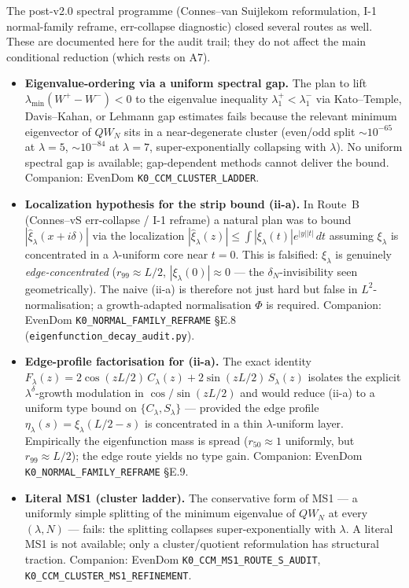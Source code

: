 \documentclass[12pt,a4paper]{article}
\theoremstyle{definition}
\theoremstyle{remark}
\begin{document}
The post-v2.0 spectral programme (Connes--van Suijlekom reformulation, I-1 normal-family reframe, err-collapse diagnostic) closed several routes as well. These are documented here for the audit trail; they do not affect the main conditional reduction (which rests on A7).

\begin{itemize}
  \item \textbf{Eigenvalue-ordering via a uniform spectral gap.} The plan to lift $\lambda_{\min}(W^+-W^-)<0$ to the eigenvalue inequality $\lambda_1^+<\lambda_1^-$ via Kato--Temple, Davis--Kahan, or Lehmann gap estimates fails because the relevant minimum eigenvector of $QW_N$ sits in a near-degenerate cluster (even/odd split $\sim\!10^{-65}$ at $\lambda=5$, $\sim\!10^{-84}$ at $\lambda=7$, super-exponentially collapsing with $\lambda$). No uniform spectral gap is available; gap-dependent methods cannot deliver the bound. Companion: EvenDom \texttt{K0\_CCM\_CLUSTER\_LADDER}.

  \item \textbf{Localization hypothesis for the strip bound (ii-a).} In Route~B (Connes--vS err-collapse / I-1 reframe) a natural plan was to bound $|\hat\xi_\lambda(x+i\delta)|$ via the localization $|\hat\xi_\lambda(z)|\leq\int|\xi_\lambda(t)|e^{|y||t|}\,dt$ assuming $\xi_\lambda$ is concentrated in a $\lambda$-uniform core near $t=0$. This is falsified: $\xi_\lambda$ is genuinely \emph{edge-concentrated} ($r_{99}\approx L/2$, $|\xi_\lambda(0)|\approx 0$ --- the $\delta_N$-invisibility seen geometrically). The naive (ii-a) is therefore not just hard but false in $L^2$-normalisation; a growth-adapted normalisation $\Phi$ is required. Companion: EvenDom \texttt{K0\_NORMAL\_FAMILY\_REFRAME} \S E.8 (\texttt{eigenfunction\_decay\_audit.py}).

  \item \textbf{Edge-profile factorisation for (ii-a).} The exact identity $F_\lambda(z) = 2\cos(zL/2)\,C_\lambda(z) + 2\sin(zL/2)\,S_\lambda(z)$ isolates the explicit $\lambda^\delta$-growth modulation in $\cos/\sin(zL/2)$ and would reduce (ii-a) to a uniform type bound on $\{C_\lambda,S_\lambda\}$ --- provided the edge profile $\eta_\lambda(s)=\xi_\lambda(L/2-s)$ is concentrated in a thin $\lambda$-uniform layer. Empirically the eigenfunction mass is spread ($r_{50}\approx 1$ uniformly, but $r_{99}\approx L/2$); the edge route yields no type gain. Companion: EvenDom \texttt{K0\_NORMAL\_FAMILY\_REFRAME} \S E.9.

  \item \textbf{Literal MS1 (cluster ladder).} The conservative form of MS1 --- a uniformly simple splitting of the minimum eigenvalue of $QW_N$ at every $(\lambda,N)$ --- fails: the splitting collapses super-exponentially with $\lambda$. A literal MS1 is not available; only a cluster/quotient reformulation has structural traction. Companion: EvenDom \texttt{K0\_CCM\_MS1\_ROUTE\_S\_AUDIT}, \texttt{K0\_CCM\_CLUSTER\_MS1\_REFINEMENT}.


\end{itemize}
\end{document}
